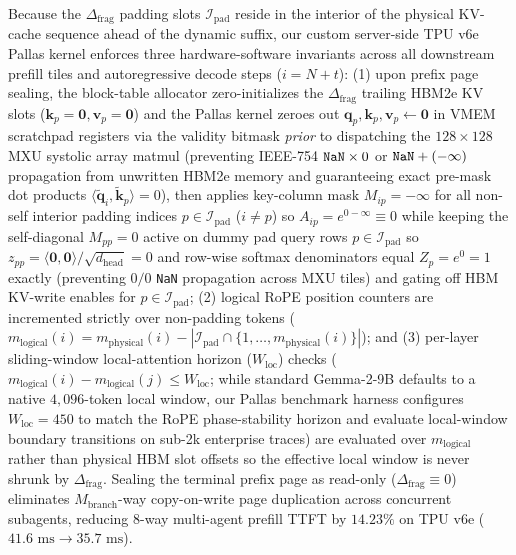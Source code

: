 \documentclass[conference,10pt]{IEEEtran}
\begin{document}
Because the $\Delta_{\text{frag}}$ padding slots $\mathcal{I}_{\text{pad}}$ reside in the interior of the physical KV-cache sequence ahead of the dynamic suffix, our custom server-side TPU v6e Pallas kernel enforces three hardware-software invariants across all downstream prefill tiles and autoregressive decode steps ($i = N + t$): (1) upon prefix page sealing, the block-table allocator zero-initializes the $\Delta_{\text{frag}}$ trailing HBM2e KV slots ($\mathbf{k}_p = \mathbf{0}, \mathbf{v}_p = \mathbf{0}$) and the Pallas kernel zeroes out $\mathbf{q}_p, \mathbf{k}_p, \mathbf{v}_p \leftarrow \mathbf{0}$ in VMEM scratchpad registers via the validity bitmask \textit{prior} to dispatching the $128 \times 128$ MXU systolic array matmul (preventing IEEE-754 $\text{\texttt{NaN}} \times 0$ or $\text{\texttt{NaN}} + (-\infty)$ propagation from unwritten HBM2e memory and guaranteeing exact pre-mask dot products $\langle \tilde{\mathbf{q}}_i, \tilde{\mathbf{k}}_p \rangle = 0$), then applies key-column mask $M_{ip} = -\infty$ for all non-self interior padding indices $p \in \mathcal{I}_{\text{pad}}$ ($i \neq p$) so $A_{ip} = e^{0 - \infty} \equiv 0$ while keeping the self-diagonal $M_{pp} = 0$ active on dummy pad query rows $p \in \mathcal{I}_{\text{pad}}$ so $z_{pp} = \langle \mathbf{0}, \mathbf{0}\rangle / \sqrt{d_{\text{head}}} = 0$ and row-wise softmax denominators equal $Z_p = e^0 = 1$ exactly (preventing $0/0$ \texttt{NaN} propagation across MXU tiles) and gating off HBM KV-write enables for $p \in \mathcal{I}_{\text{pad}}$; (2) logical RoPE position counters are incremented strictly over non-padding tokens ($m_{\text{logical}}(i) = m_{\text{physical}}(i) - |\mathcal{I}_{\text{pad}} \cap \{1, \dots, m_{\text{physical}}(i)\}|$); and (3) per-layer sliding-window local-attention horizon ($W_{\text{loc}}$) checks ($m_{\text{logical}}(i) - m_{\text{logical}}(j) \le W_{\text{loc}}$; while standard Gemma-2-9B defaults to a native $4{,}096$-token local window, our Pallas benchmark harness configures $W_{\text{loc}} = 450$ to match the RoPE phase-stability horizon and evaluate local-window boundary transitions on sub-2k enterprise traces) are evaluated over $m_{\text{logical}}$ rather than physical HBM slot offsets so the effective local window is never shrunk by $\Delta_{\text{frag}}$. Sealing the terminal prefix page as read-only ($\Delta_{\text{frag}} \equiv 0$) eliminates $M_{\text{branch}}$-way copy-on-write page duplication across concurrent subagents, reducing 8-way multi-agent prefill TTFT by $14.23\%$ on TPU v6e ($41.6\text{ ms} \to 35.7\text{ ms}$).
\end{document}
